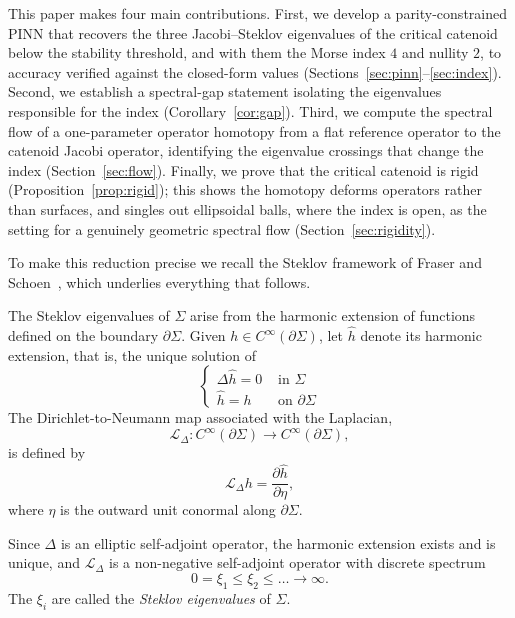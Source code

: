 \documentclass[11pt]{article}
\theoremstyle{definition}
\theoremstyle{plain}
\begin{document}
This paper makes four main contributions. First, we develop a parity-constrained PINN that recovers the three Jacobi--Steklov eigenvalues of the critical catenoid below the stability threshold, and with them the Morse index $4$ and nullity $2$, to accuracy verified against the closed-form values (Sections~\ref{sec:pinn}--\ref{sec:index}). Second, we establish a spectral-gap statement isolating the eigenvalues responsible for the index (Corollary~\ref{cor:gap}). Third, we compute the spectral flow of a one-parameter operator homotopy from a flat reference operator to the catenoid Jacobi operator, identifying the eigenvalue crossings that change the index (Section~\ref{sec:flow}). Finally, we prove that the critical catenoid is rigid (Proposition~\ref{prop:rigid}); this shows the homotopy deforms operators rather than surfaces, and singles out ellipsoidal balls, where the index is open, as the setting for a genuinely geometric spectral flow (Section~\ref{sec:rigidity}).

To make this reduction precise we recall the Steklov framework of Fraser and Schoen~\cite{fraser01, fraser04, fraser05}, which underlies everything that follows.

The Steklov eigenvalues of $\Sigma$ arise from the harmonic extension of functions defined on the boundary $\partial \Sigma$. Given $h \in C^\infty(\partial \Sigma)$, let $\hat{h}$ denote its harmonic extension, that is, the unique solution of
\begin{equation}
	\begin{cases}
		\Delta \hat{h} = 0 & \text{ in } \Sigma          \\
		\hat{h} = h        & \text{ on } \partial \Sigma
	\end{cases}
\end{equation}
The Dirichlet-to-Neumann map associated with the Laplacian,
\begin{equation}
	\mathcal{L}_\Delta : C^\infty (\partial \Sigma) \to C^\infty (\partial \Sigma ),
\end{equation}
is defined by
\begin{equation}
	\mathcal{L}_\Delta h = \dfrac{\partial \hat{h}}{\partial \eta},
\end{equation}
where $\eta$ is the outward unit conormal along $\partial \Sigma$.

Since $\Delta$ is an elliptic self-adjoint operator, the harmonic extension exists and is unique, and $\mathcal{L}_\Delta$ is a non-negative self-adjoint operator with discrete spectrum
\begin{equation}
	0 = \xi_1 \leq \xi_2 \leq \dots \to \infty.
\end{equation}
The $\xi_i$ are called the \emph{Steklov eigenvalues} of $\Sigma$.
\end{document}
